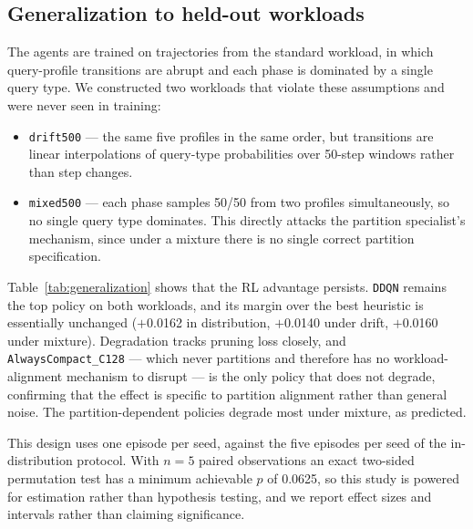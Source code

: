 \documentclass[fleqn,10pt]{wlscirep}
\newcommand{\ddqn}{\texttt{DDQN}}
\begin{document}
\FloatBarrier

\subsection*{Generalization to held-out workloads}
\label{sec:generalization}

The agents are trained on trajectories from the standard workload, in
which query-profile transitions are abrupt and each phase is dominated
by a single query type. We constructed two workloads that violate these
assumptions and were never seen in training:

\begin{itemize}
\item \texttt{drift500} --- the same five profiles in the same order,
  but transitions are linear interpolations of query-type probabilities
  over 50-step windows rather than step changes.
\item \texttt{mixed500} --- each phase samples 50/50 from two profiles
  simultaneously, so no single query type dominates. This directly
  attacks the partition specialist's mechanism, since under a mixture
  there is no single correct partition specification.
\end{itemize}

Table~\ref{tab:generalization} shows that the RL advantage persists.
\ddqn{} remains the top policy on both workloads, and its margin over
the best heuristic is essentially unchanged ($+$0.0162 in distribution,
$+$0.0140 under drift, $+$0.0160 under mixture). Degradation tracks
pruning loss closely, and \texttt{AlwaysCompact\_C128} --- which never
partitions and therefore has no workload-alignment mechanism to
disrupt --- is the only policy that does not degrade, confirming that
the effect is specific to partition alignment rather than general noise.
The partition-dependent policies degrade most under mixture, as
predicted.

This design uses one episode per seed, against the five episodes per
seed of the in-distribution protocol. With $n = 5$ paired observations
an exact two-sided permutation test has a minimum achievable $p$ of
0.0625, so this study is powered for estimation rather than hypothesis
testing, and we report effect sizes and intervals rather than claiming
significance.
\end{document}
